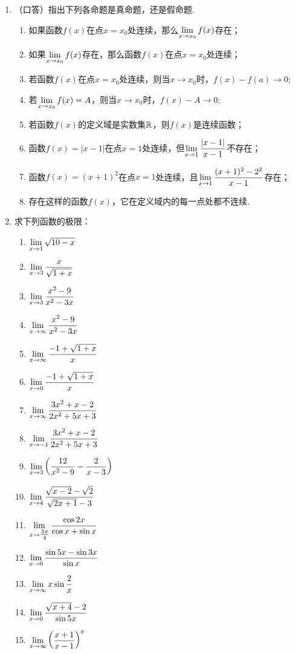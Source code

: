 \begin{enumerate}
    \item （口答）指出下列各命题是真命题，还是假命题.
\begin{enumerate}[(1)]
\item 如果函数$f(x)$在点$x=x_0$处连续，那么$\lim\limits_{x\to x_0}f(x)$存在；
\item 如果$\lim\limits_{x\to x_0}f(x)$存在，那么函数$f(x)$在点$x=x_0$处连续；
\item 若函数$f(x)$在点$x=x_0$处连续，则当$x\to x_0$时，$f(x)-f(a)\to 0$;
\item 若$\lim\limits_{x\to x_0}f(x)=A$，则当$x\to x_0$时，$f(x)-A\to 0$;
\item 若函数$f(x)$的定义域是实数集$\mathbb{R}$，则$f(x)$是连续函数；
\item 函数$f(x)=|x-1|$在点$x=1$处连续，但$\lim\limits_{x\to 1}\dfrac{|x-1|}{x-1}$不存在；
\item 函数$f(x)=(x+1)^2$在点$x=1$处连续，且$\lim\limits_{x\to 1}\dfrac{(x+1)^2-2^2}{x-1}$存在；
\item 存在这样的函数$f(x)$，它在定义域内的每一点处都不连续.
\end{enumerate}

\item 求下列函数的极限：
\begin{multicols}{2}
\begin{enumerate}[(1)]
    \item $\lim\limits_{x\to 1}\sqrt{10-x} $
    \item $\lim\limits_{x\to 3}\dfrac{x}{\sqrt{1+x}} $
    \item $\lim\limits_{x\to 3}\dfrac{x^2-9}{x^2-3x} $
    \item $\lim\limits_{x\to \infty}\dfrac{x^2-9}{x^2-3x} $
    \item $\lim\limits_{x\to \infty}\dfrac{-1+\sqrt{1+x}}{x} $
    \item $\lim\limits_{x\to 0}\dfrac{-1+\sqrt{1+x}}{x} $
    \item $\lim\limits_{x\to \infty}\dfrac{3x^2+x-2}{2x^2+5x+3} $
    \item $\lim\limits_{x\to -1}\dfrac{3x^2+x-2}{2x^2+5x+3} $
    \item $\lim\limits_{x\to 3}\left(\dfrac{12}{x^2-9}-\dfrac{2}{x-3}\right) $
    \item $\lim\limits_{x\to 4}\dfrac{\sqrt{x-2}-\sqrt{2}}{\sqrt{2x+1}-3} $
    \item $\lim\limits_{x\to \tfrac{3\pi}{4}} \dfrac{\cos 2x}{\cos x+\sin x}$
    \item $\lim\limits_{x\to 0} \dfrac{\sin 5x-\sin 3x}{\sin x}$
    \item $\lim\limits_{x\to \infty}x\sin\dfrac{2}{x} $
    \item $\lim\limits_{x\to 0} \dfrac{\sqrt{x+4}-2}{\sin 5x}$
    \item $\lim\limits_{x\to \infty}\left(\dfrac{x+1}{x-1}\right)^x $
\end{enumerate}
\end{multicols}
\end{enumerate}

